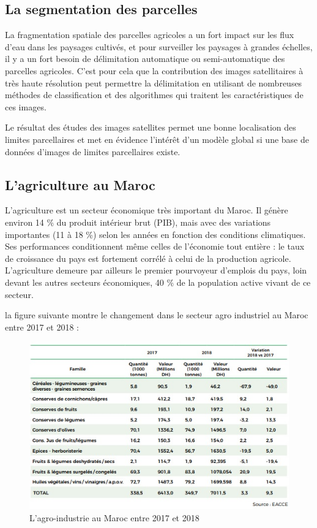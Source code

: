 \documentclass[12pt, openany]{report}
\begin{document}
\subsection{La segmentation des parcelles}

La fragmentation spatiale des parcelles agricoles a un fort impact sur les flux d’eau dans les paysages cultivés, et pour surveiller les paysages à grandes échelles, il y a un fort besoin de délimitation automatique ou semi-automatique des parcelles agricoles. C’est pour cela que la contribution des images satellitaires à très haute résolution peut permettre la délimitation en utilisant de nombreuses méthodes de classification et des algorithmes qui traitent les caractéristiques de ces images.\cite{frag}

Le résultat des études des images satellites permet une bonne localisation des limites parcellaires et met en évidence l’intérêt d’un modèle global si une base de données d’images de limites parcellaires existe. 

\subsection{L'agriculture au Maroc}

L'agriculture est un secteur économique très important du Maroc. Il génère environ 14 \% du produit intérieur brut (PIB), mais avec des variations importantes (11 à 18 \%) selon les années en fonction des conditions climatiques. Ses performances conditionnent même celles de l’économie tout entière : le taux de croissance du pays est fortement corrélé à celui de la production agricole. L’agriculture demeure par ailleurs le premier pourvoyeur d’emplois du pays, loin devant les autres secteurs économiques, 40 \% de la population active vivant de ce secteur.\cite{imagesatt}

la figure suivante montre le changement dans le secteur agro industriel au Maroc entre 2017 et 2018 :


\begin{figure}[H]
\centering
\includegraphics[scale=1.2]{agr.jpg}
\caption{L'agro-industrie au Maroc entre 2017 et 2018}
\end{figure}
\end{document}
